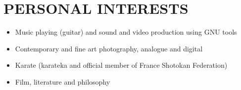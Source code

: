 \documentclass[a4paper, oneside, final]{scrartcl}
\begin{document}
\section{PERSONAL INTERESTS}
\begin{itemize}
   \item Music playing (guitar) and sound and video production using GNU
            tools
   \item Contemporary and fine art photography, analogue and digital 
   \item Karate (karateka and official member of France Shotokan Federation)
   \item Film, literature and philosophy
\end{itemize}
\end{document}
